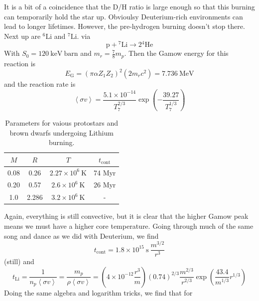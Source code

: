 \documentclass[10pt]{article}
\numberwithin{equation}{section}
\newcommand{\n}{\noindent}
\newcommand{\avg}[1]{\left\langle#1\right\rangle}
\begin{document}
  \n It is a bit of a coincidence that the D/H ratio is large enough so
  that this burning can temporarily hold the star up. Obvioulsy
  Deuterium-rich environments can lead to longer lifetimes. However,
  the pre-hydrogen burning doesn't stop there. Next up are
  ${}^6\mathrm{Li}$ and ${}^7\mathrm{Li}$. via
  \begin{equation}
    \label{eq:398}
    \mathrm{p+{}^7Li\to 2{}^4He}
  \end{equation}
  With $S_0=120\ \mathrm{keV\ barn}$ and $m_r=\frac{7}{8}m_p$. Then
  the Gamow energy for this reaction is
  \begin{equation}
    \label{eq:399}
    E_{\mathrm{G}}=(\pi\alpha Z_1Z_2)^2(2m_rc^2)=7.736\ \mathrm{MeV}
  \end{equation}
  and the reaction rate is
  \begin{equation}
    \label{eq:400}
    \avg{\sigma v}=\frac{5.1\times
      10^{-14}}{T_7^{2/3}}\exp\left(-\frac{39.27}{T_7^{1/3}}\right)
  \end{equation}
  \begin{table}[htb]
    \centering
    \begin{tabular}{cccc}
      $M$ & $R$ & $T$ & $t_{\mathrm{cont}}$\\
      \hline\hline
      0.08 & 0.26 & $2.27\times 10^{6}\ \mathrm{K}$ & 74 Myr\\
      0.20 & 0.57 & $2.6\times 10^6\ \mathrm{K}$ & 26 Myr\\
      1.0 & 2.286 & $3.2\times 10^6\ \mathrm{K}$ & -
    \end{tabular}
    \caption{Parameters for vaious protostars and brown dwarfs undergoing Lithium burning.}
    \label{tab:lithium}
  \end{table}
  Again, everything is still convective, but it is clear that the
  higher Gamow peak means we must have a higher core
  temperature. Going through much of the same song and dance as we did
  with Deuterium, we find
  \begin{equation}
    \label{eq:401}
    t_{\mathrm{cont}}=1.8\times 10^{15}\ \mathrm{s}\ \frac{m^{3/2}}{r^3}
  \end{equation}
  (still) and 
  \begin{equation}
    \label{eq:402}
    t_{\mathrm{Li}}=\frac{1}{n_p\avg{\sigma
          v}}=\frac{m_p}{\rho\avg{\sigma v}}=\left(4\times 10^{-12}\frac{r^3}{m}\right)(0.74)^{2/3}\frac{m^{2/3}}{r^{2/3}}\exp\left(\frac{43.4}{m^{1/3}}r^{1/3}\right)
  \end{equation}
  Doing the same algebra and logarithm tricks, we find that for
\end{document}
